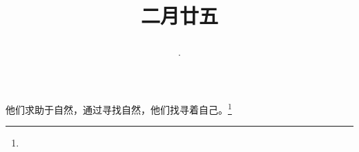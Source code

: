 \title{\date[d=3,m=4,y=2024][year:cn-y,年,month:cn,day:cn,日,·,weekday]·二月廿五 }
他们求助于自然，通过寻找自然，他们找寻着自己。\footnote{ }

